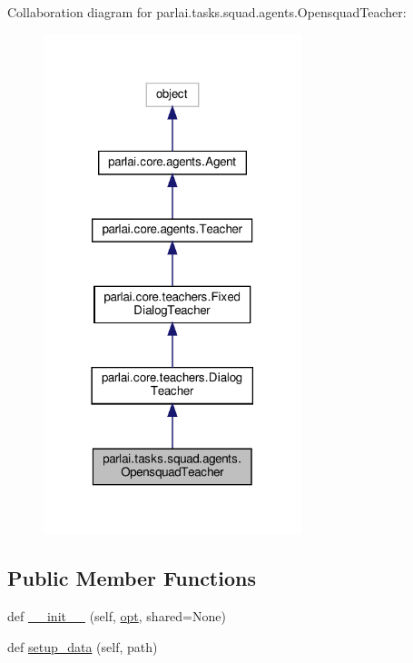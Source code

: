 Collaboration diagram for parlai.\+tasks.\+squad.\+agents.\+Opensquad\+Teacher\+:\nopagebreak
\begin{figure}[H]
\begin{center}
\leavevmode
\includegraphics[width=213pt]{d9/d0b/classparlai_1_1tasks_1_1squad_1_1agents_1_1OpensquadTeacher__coll__graph}
\end{center}
\end{figure}
\subsection*{Public Member Functions}
\begin{DoxyCompactItemize}
\item 
def \hyperlink{classparlai_1_1tasks_1_1squad_1_1agents_1_1OpensquadTeacher_a1b05b43517db8f76098f6901d2b7516b}{\+\_\+\+\_\+init\+\_\+\+\_\+} (self, \hyperlink{classparlai_1_1core_1_1agents_1_1Teacher_a3ce6243860ce978a897922863ed32fa4}{opt}, shared=None)
\item 
def \hyperlink{classparlai_1_1tasks_1_1squad_1_1agents_1_1OpensquadTeacher_a3cec5f85dee7d30e1a80a4ce8c775a07}{setup\+\_\+data} (self, path)
\end{DoxyCompactItemize}
